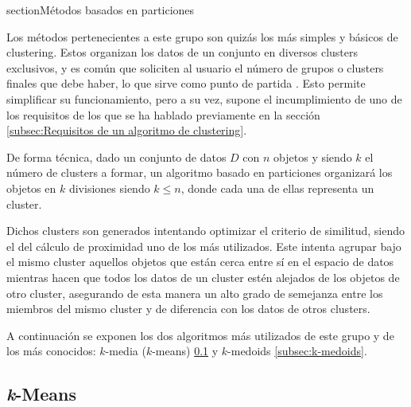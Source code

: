 \documentclass[10pt, a4paper]{article}
\begin{document}

section{Métodos basados en particiones} \label{sec:Métodos basados en particiones}

\cite{LIBRO} Los métodos pertenecientes a este grupo son quizás los más simples y básicos de clustering. Estos organizan los datos de un conjunto en diversos clusters exclusivos, y es común que soliciten al usuario el número de grupos o clusters finales que debe haber, lo que sirve como punto de partida . Esto permite simplificar su funcionamiento, pero a su vez, supone el incumplimiento de uno de los requisitos de los que se ha hablado previamente en la sección \ref{subsec:Requisitos de un algoritmo de clustering}.

De forma técnica, dado un conjunto de datos $D$ con $n$ objetos y siendo $k$ el número de clusters a formar, un algoritmo basado en particiones organizará los objetos en $k$ divisiones siendo $k \leq n$, donde cada una de ellas representa un cluster. 

Dichos clusters son generados intentando optimizar el criterio de similitud, siendo el del cálculo de proximidad uno de los más utilizados. Este intenta agrupar bajo el mismo cluster aquellos objetos que están cerca entre sí en el espacio de datos mientras hacen que todos los datos de un cluster estén alejados de los objetos de otro cluster, asegurando de esta manera un alto grado de semejanza entre los miembros del mismo cluster y de diferencia con los datos de otros clusters.

A continuación se exponen los dos algoritmos más utilizados de este grupo y de los más conocidos: $k$-media ($k$-means) \ref{subsec:k-means} y $k$-medoids \ref{subsec:k-medoids}.




\subsection{\textbf{\textit{k}-Means}} \label{subsec:k-means}
\end{document}
